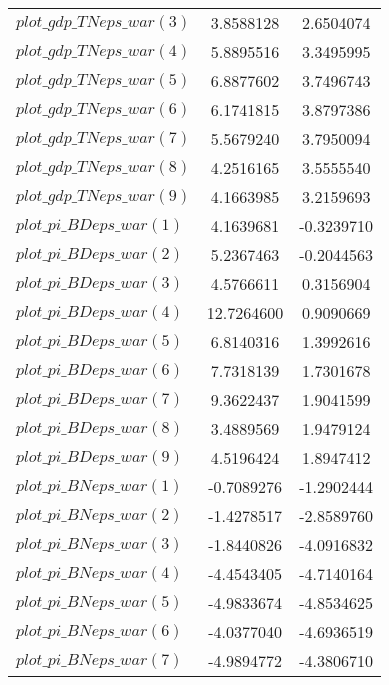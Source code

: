 \begin{center}
\begin{longtable}{lcc}
$plot\_gdp\_TN eps\_war (3)  $	 & 	      3.8588128	 & 	      2.6504074 \\ 
$plot\_gdp\_TN eps\_war (4)  $	 & 	      5.8895516	 & 	      3.3495995 \\ 
$plot\_gdp\_TN eps\_war (5)  $	 & 	      6.8877602	 & 	      3.7496743 \\ 
$plot\_gdp\_TN eps\_war (6)  $	 & 	      6.1741815	 & 	      3.8797386 \\ 
$plot\_gdp\_TN eps\_war (7)  $	 & 	      5.5679240	 & 	      3.7950094 \\ 
$plot\_gdp\_TN eps\_war (8)  $	 & 	      4.2516165	 & 	      3.5555540 \\ 
$plot\_gdp\_TN eps\_war (9)  $	 & 	      4.1663985	 & 	      3.2159693 \\ 
$plot\_pi\_BD eps\_war (1)   $	 & 	      4.1639681	 & 	     -0.3239710 \\ 
$plot\_pi\_BD eps\_war (2)   $	 & 	      5.2367463	 & 	     -0.2044563 \\ 
$plot\_pi\_BD eps\_war (3)   $	 & 	      4.5766611	 & 	      0.3156904 \\ 
$plot\_pi\_BD eps\_war (4)   $	 & 	     12.7264600	 & 	      0.9090669 \\ 
$plot\_pi\_BD eps\_war (5)   $	 & 	      6.8140316	 & 	      1.3992616 \\ 
$plot\_pi\_BD eps\_war (6)   $	 & 	      7.7318139	 & 	      1.7301678 \\ 
$plot\_pi\_BD eps\_war (7)   $	 & 	      9.3622437	 & 	      1.9041599 \\ 
$plot\_pi\_BD eps\_war (8)   $	 & 	      3.4889569	 & 	      1.9479124 \\ 
$plot\_pi\_BD eps\_war (9)   $	 & 	      4.5196424	 & 	      1.8947412 \\ 
$plot\_pi\_BN eps\_war (1)   $	 & 	     -0.7089276	 & 	     -1.2902444 \\ 
$plot\_pi\_BN eps\_war (2)   $	 & 	     -1.4278517	 & 	     -2.8589760 \\ 
$plot\_pi\_BN eps\_war (3)   $	 & 	     -1.8440826	 & 	     -4.0916832 \\ 
$plot\_pi\_BN eps\_war (4)   $	 & 	     -4.4543405	 & 	     -4.7140164 \\ 
$plot\_pi\_BN eps\_war (5)   $	 & 	     -4.9833674	 & 	     -4.8534625 \\ 
$plot\_pi\_BN eps\_war (6)   $	 & 	     -4.0377040	 & 	     -4.6936519 \\ 
$plot\_pi\_BN eps\_war (7)   $	 & 	     -4.9894772	 & 	     -4.3806710 \\ 

\end{longtable}
\end{center}
